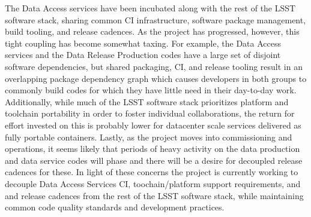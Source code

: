 The Data Access services have been incubated along with the rest of the LSST software stack, sharing common CI
infrastructure, software package management, build tooling, and release cadences.  As the project has
progressed, however, this tight coupling has become somewhat taxing.  For example, the Data Access services
and the Data Release Production codes have a large set of disjoint software dependencies, but shared
packaging, CI, and release tooling result in an overlapping package dependency graph which causes developers
in both groups to commonly build codes for which they have little need in their day-to-day work. Additionally,
while much of the LSST software stack prioritizes platform and toolchain portability in order to foster
individual collaborations, the return for effort invested on this is probably lower for datacenter scale
services delivered as fully portable containers.  Lastly, as the project moves into commissioning and
operations, it seems likely that periods of heavy activity on the data production and data service codes will
phase and there will be a desire for decoupled release cadences for these.  In light of these concerns the
project is currently working to decouple Data Access Services CI, toochain/platform support requirements,
and and release cadences from the rest of the LSST software stack, while maintaining common code quality
standards and development practices.
